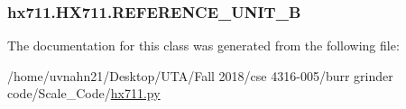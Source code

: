 \subsubsection[{\texorpdfstring{R\+E\+F\+E\+R\+E\+N\+C\+E\+\_\+\+U\+N\+I\+T\+\_\+B}{REFERENCE_UNIT_B}}]{\setlength{\rightskip}{0pt plus 5cm}hx711.\+H\+X711.\+R\+E\+F\+E\+R\+E\+N\+C\+E\+\_\+\+U\+N\+I\+T\+\_\+B}\hypertarget{classhx711_1_1HX711_a8657198fce62528681bc163b88c17b58}{}\label{classhx711_1_1HX711_a8657198fce62528681bc163b88c17b58}


The documentation for this class was generated from the following file\+:\begin{DoxyCompactItemize}
\item 
/home/uvnahn21/\+Desktop/\+U\+T\+A/\+Fall 2018/cse 4316-\/005/burr grinder code/\+Scale\+\_\+\+Code/\hyperlink{Scale__Code_2hx711_8py}{hx711.\+py}\end{DoxyCompactItemize}
